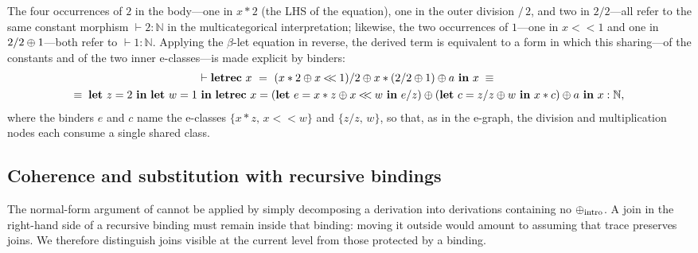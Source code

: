 The four occurrences of $2$ in the body---one in $x*2$ (the LHS of the equation), one in the outer division $/\,2$, and two in $2/2$---all refer to the same constant morphism $\vdash 2 : \mathbb{N}$ in the multicategorical interpretation; likewise, the two occurrences of $1$---one in $x \mathbin{<\!\!<} 1$ and one in $2/2 \mathbin{\oplus} 1$---both refer to $\vdash 1 : \mathbb{N}$.
Applying the $\beta$-let equation in reverse, the derived term is equivalent to a form in which this sharing---of the constants and of the two inner e-classes---is made explicit by binders:
\begin{gather*}
\vdash \textbf{letrec}\ x\ =\ (x*2\join x\mathbin{<\!\!<}1)/2 \join x*(2/2\join 1) \join a\ \textbf{in}\ x \;\equiv\;\\
\equiv\; \textbf{let}\ z = 2\ \textbf{in}\ \textbf{let}\ w = 1\ \textbf{in}\ \textbf{letrec}\ x = (\textbf{let}\ e = x*z \join x\mathbin{<\!\!<}w\ \textbf{in}\ e/z) \join (\textbf{let}\ c = z/z \join w\ \textbf{in}\ x*c) \join a\ \textbf{in}\ x : \mathbb{N},
\end{gather*}
where the binders $e$ and $c$ name the e-classes $\{x * z,\, x \mathbin{<\!\!<} w\}$ and $\{z/z,\, w\}$, so that, as in the e-graph, the division and multiplication nodes each consume a single shared class.

\subsection{Coherence and substitution with recursive bindings}
\label{app:recursive-binding-details}

The normal-form argument of  cannot be applied by
simply decomposing a derivation into derivations containing no
$\mathbin{\oplus}_{\mathrm{intro}}$.  A join in the right-hand side of a recursive binding
must remain inside that binding: moving it outside would amount to assuming
that trace preserves joins.  We therefore distinguish joins visible at the
current level from those protected by a binding.

